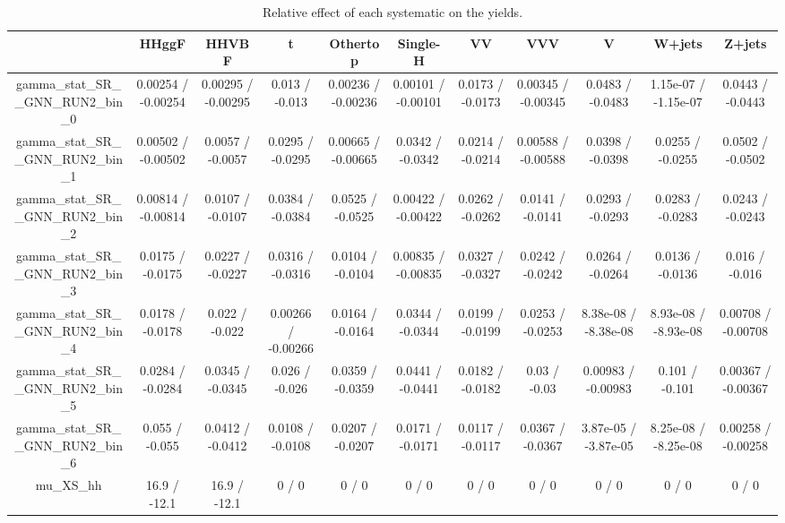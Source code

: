 \documentclass[10pt]{article}
\begin{document}
\begin{table}[htbp]
\begin{center}
\begin{tabular}{|c|c|c|c|c|c|c|c|c|c|c|}
\hline 
      & HHggF      & HHVBF      & t      & Othertop      & Single-H      & VV      & VVV      & V      & W+jets      & Z+jets \\ 
\hline 
  gamma_stat_SR__GNN_RUN2_bin_0 & 0.00254 / -0.00254 & 0.00295 / -0.00295 & 0.013 / -0.013 & 0.00236 / -0.00236 & 0.00101 / -0.00101 & 0.0173 / -0.0173 & 0.00345 / -0.00345 & 0.0483 / -0.0483 & 1.15e-07 / -1.15e-07 & 0.0443 / -0.0443 \\ 
  gamma_stat_SR__GNN_RUN2_bin_1 & 0.00502 / -0.00502 & 0.0057 / -0.0057 & 0.0295 / -0.0295 & 0.00665 / -0.00665 & 0.0342 / -0.0342 & 0.0214 / -0.0214 & 0.00588 / -0.00588 & 0.0398 / -0.0398 & 0.0255 / -0.0255 & 0.0502 / -0.0502 \\ 
  gamma_stat_SR__GNN_RUN2_bin_2 & 0.00814 / -0.00814 & 0.0107 / -0.0107 & 0.0384 / -0.0384 & 0.0525 / -0.0525 & 0.00422 / -0.00422 & 0.0262 / -0.0262 & 0.0141 / -0.0141 & 0.0293 / -0.0293 & 0.0283 / -0.0283 & 0.0243 / -0.0243 \\ 
  gamma_stat_SR__GNN_RUN2_bin_3 & 0.0175 / -0.0175 & 0.0227 / -0.0227 & 0.0316 / -0.0316 & 0.0104 / -0.0104 & 0.00835 / -0.00835 & 0.0327 / -0.0327 & 0.0242 / -0.0242 & 0.0264 / -0.0264 & 0.0136 / -0.0136 & 0.016 / -0.016 \\ 
  gamma_stat_SR__GNN_RUN2_bin_4 & 0.0178 / -0.0178 & 0.022 / -0.022 & 0.00266 / -0.00266 & 0.0164 / -0.0164 & 0.0344 / -0.0344 & 0.0199 / -0.0199 & 0.0253 / -0.0253 & 8.38e-08 / -8.38e-08 & 8.93e-08 / -8.93e-08 & 0.00708 / -0.00708 \\ 
  gamma_stat_SR__GNN_RUN2_bin_5 & 0.0284 / -0.0284 & 0.0345 / -0.0345 & 0.026 / -0.026 & 0.0359 / -0.0359 & 0.0441 / -0.0441 & 0.0182 / -0.0182 & 0.03 / -0.03 & 0.00983 / -0.00983 & 0.101 / -0.101 & 0.00367 / -0.00367 \\ 
  gamma_stat_SR__GNN_RUN2_bin_6 & 0.055 / -0.055 & 0.0412 / -0.0412 & 0.0108 / -0.0108 & 0.0207 / -0.0207 & 0.0171 / -0.0171 & 0.0117 / -0.0117 & 0.0367 / -0.0367 & 3.87e-05 / -3.87e-05 & 8.25e-08 / -8.25e-08 & 0.00258 / -0.00258 \\ 
  mu_XS_hh & 16.9 / -12.1 & 16.9 / -12.1 & 0 / 0 & 0 / 0 & 0 / 0 & 0 / 0 & 0 / 0 & 0 / 0 & 0 / 0 & 0 / 0 \\ 
\hline 
\end{tabular} 
\caption{Relative effect of each systematic on the yields.} 
\end{center} 
\end{table} 
\end{document}

